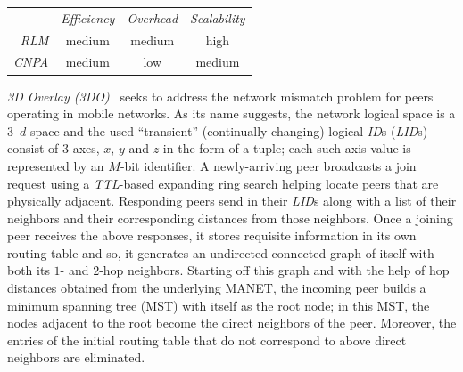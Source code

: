 \begin{center}
{\footnotesize
\begin{tabular}{rccc}
\multicolumn{1}{r}{} &
\multicolumn{1}{c}{\emph{Efficiency}} &
\multicolumn{1}{c}{\emph{Overhead}} &
\multicolumn{1}{c}{\emph{Scalability}}
\\
\cline{2-4}
\emph{RLM} &
medium &
%
medium &
high \\
\emph{CNPA} &
%
medium &
low &
medium \\
\end{tabular}
}
\end{center}

\emph{3D Overlay (3DO)}~\cite{AOS2014} seeks to address the 
network mismatch problem  for peers operating in mobile networks.
As its name suggests, the network logical space is 
a $3$--$d$ space and the used ``transient'' (continually changing) 
logical \emph{ID}s (\emph{LID}s) consist of $3$ axes, $x$, $y$ and $z$ 
in the form of a tuple;
each such axis value is represented by an $M$-bit identifier.
A newly-arriving peer broadcasts a join request using
a \emph{TTL}-based expanding ring search helping locate 
peers that are physically adjacent.
Responding peers send in 
their \emph{LID}s along with a list of their neighbors 
and their corresponding distances from those neighbors. 
Once a joining peer receives the above responses,
it stores requisite information in its own routing table 
and so, it generates an undirected connected
graph of itself with both its $1$- and $2$-hop neighbors. 
Starting off this graph and with the help of hop 
distances obtained from the underlying MANET,
the incoming peer builds a minimum spanning tree (MST)
with itself as the root node; 
in this MST, the nodes adjacent to the root become the
direct neighbors of the peer.
Moreover, the entries of the initial routing table 
that do not correspond to above direct neighbors are
eliminated.

